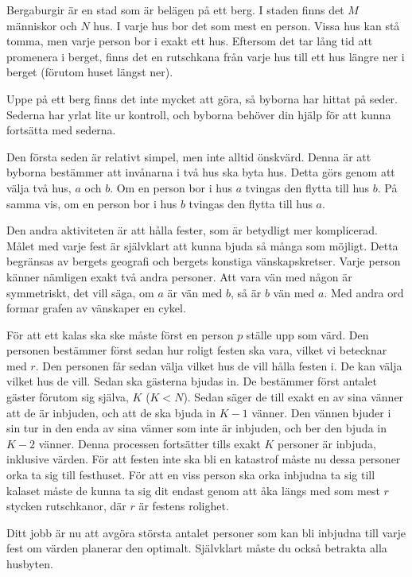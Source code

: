 Bergaburgir är en stad som är belägen på ett berg.
I staden finns det $M$ människor och $N$ hus.
I varje hus bor det som mest en person.
Vissa hus kan stå tomma, men varje person bor i exakt ett hus.
Eftersom det tar lång tid att promenera i berget, finns det en rutschkana från varje hus till ett hus längre ner i berget (förutom huset längst ner).

Uppe på ett berg finns det inte mycket att göra, så byborna har hittat på seder.
Sederna har yrlat lite ur kontroll, och byborna behöver din hjälp för att kunna fortsätta med sederna.

Den första seden är relativt simpel, men inte alltid önskvärd.
Denna är att byborna bestämmer att invånarna i två hus ska byta hus.
Detta görs genom att välja två hus, $a$ och $b$.
Om en person bor i hus $a$ tvingas den flytta till hus $b$.
På samma vis, om en person bor i hus $b$ tvingas den flytta till hus $a$.

Den andra aktiviteten är att hålla fester, som är betydligt mer komplicerad.
Målet med varje fest är självklart att kunna bjuda så många som möjligt.
Detta begränsas av bergets geografi och bergets konstiga vänskapskretser.
Varje person känner nämligen exakt två andra personer.
Att vara vän med någon är symmetriskt, det vill säga, om $a$ är vän med $b$, så är $b$ vän med $a$.
Med andra ord formar grafen av vänskaper en cykel.

För att ett kalas ska ske måste först en person $p$ ställe upp som värd.
Den personen bestämmer först sedan hur roligt festen ska vara, vilket vi betecknar med $r$.
Den personen får sedan välja vilket hus de vill hålla festen i.
De kan välja vilket hus de vill.
Sedan ska gästerna bjudas in.
De bestämmer först antalet gäster förutom sig själva, $K$ ($K < N$).
Sedan säger de till exakt en av sina vänner att de är inbjuden, och att de ska bjuda in $K-1$ vänner.
Den vännen bjuder i sin tur in den enda av sina vänner som inte är inbjuden, och ber den bjuda in $K-2$ vänner.
Denna processen fortsätter tills exakt $K$ personer är inbjuda, inklusive värden.
För att festen inte ska bli en katastrof måste nu dessa personer orka ta sig till festhuset.
För att en viss person ska orka inbjudna ta sig till kalaset måste de kunna ta sig dit endast genom att åka längs
med som mest $r$ stycken rutschkanor, där $r$ är festens rolighet.

Ditt jobb är nu att avgöra största antalet personer som kan bli inbjudna till varje fest om värden planerar den optimalt.
Självklart måste du också betrakta alla husbyten.


